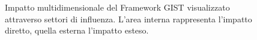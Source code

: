 \begin{figure}[htbp]
\caption{Impatto multidimensionale del Framework GIST visualizzato attraverso settori di influenza. L'area interna rappresenta l'impatto diretto, quella esterna l'impatto esteso.}
\label{fig:impatto_v1}
\end{figure}


